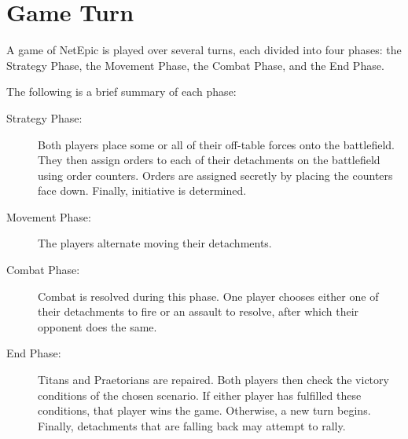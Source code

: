 \section{Game Turn}
A game of NetEpic is played over several turns, each divided into four phases: the Strategy Phase, the Movement Phase, the Combat Phase, and the End Phase.

The following is a brief summary of each phase:

\begin{description}
    \item[Strategy Phase:] Both players place some or all of their off-table forces onto the battlefield. They then assign orders to each of their detachments on the battlefield using order counters. Orders are assigned secretly by placing the counters face down. Finally, initiative is determined.

    \item[Movement Phase:] The players alternate moving their detachments.

    \item[Combat Phase:] Combat is resolved during this phase. One player chooses either one of their detachments to fire or an assault to resolve, after which their opponent does the same.

    \item[End Phase:] Titans and Praetorians are repaired. Both players then check the victory conditions of the chosen scenario. If either player has fulfilled these conditions, that player wins the game. Otherwise, a new turn begins. Finally, detachments that are falling back may attempt to rally.
\end{description}